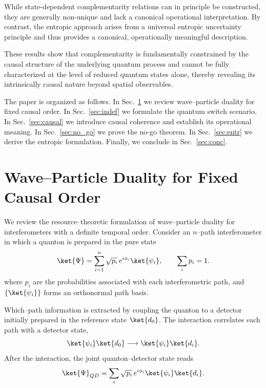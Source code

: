 \documentclass[aps,pra,reprint,superscriptaddress]{revtex4-2}
\begin{document}
While state-dependent complementarity relations can in principle be
constructed, they are generally non-unique and lack a canonical
operational interpretation. By contrast, the entropic approach arises
from a universal entropic uncertainty principle and thus provides a
canonical, operationally meaningful description.

These results show that complementarity is fundamentally constrained by
the causal structure of the underlying quantum process and cannot be
fully characterized at the level of reduced quantum states alone,
thereby revealing its intrinsically causal nature beyond spatial
observables.

The paper is organized as follows. In Sec.~\ref{sec:fixed} we review
wave--particle duality for fixed causal order. In
Sec.~\ref{sec:indef} we formulate the quantum switch scenario. In
Sec.~\ref{sec:causal} we introduce causal coherence and establish
its operational meaning. In Sec.~\ref{sec:no_go} we prove the no-go
theorem. In Sec.~\ref{sec:entr} we derive the entropic formulation.
Finally, we conclude in Sec.~\ref{sec:conc}.

	\section{Wave--Particle Duality for Fixed Causal Order}\label{sec:fixed}
	We review the resource--theoretic formulation of wave--particle duality
	for interferometers with a definite temporal order.
	Consider an $n$--path interferometer in which a quanton is prepared in the pure state
	\begin{equation}
		\ket{\Psi}=\sum_{i=1}^n \sqrt{p_i}\,e^{i\phi_i}\ket{\psi_i},
		\qquad
		\sum_i p_i=1 .
	\end{equation}
	where $p_i$ are the probabilities associated with each interferometric path, and $\{\ket{\psi_i}\}$ forms an orthonormal path basis.
	
	Which--path information is extracted by coupling the quanton to a detector
	initially prepared in the reference state $\ket{d_0}$.
	The interaction correlates each path with a detector state,
	\begin{equation}
		\ket{\psi_i}\ket{d_0}\longrightarrow \ket{\psi_i}\ket{d_i}.
	\end{equation}
	After the interaction, the joint quanton--detector state reads
	\begin{equation}
		\ket{\Psi}_{QD}=\sum_i \sqrt{p_i}\,e^{i\phi_i}\ket{\psi_i}\ket{d_i}.
	\end{equation}
	
\end{document}
